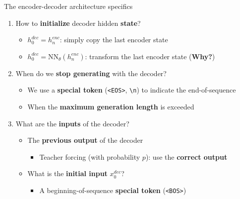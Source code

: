 \documentclass[12pt,aspectratio=169,handout]{beamer}
\begin{document}
\begin{frame}[fragile]{The encoder-decoder architecture specifics}

\begin{enumerate}
\item How to \textbf{initialize} decoder hidden \textbf{state}?
\pause
\begin{itemize}
	\item $h_{0}^{dec} = h_{n}^{enc}$: simply copy the last encoder state
	\item $h_{0}^{dec} = \text{NN}_{\theta}(h_{n}^{enc})$: transform the last encoder state (\textbf{Why?})
\end{itemize}
\pause
\item When do we \textbf{stop generating} with the decoder?
\pause
\begin{itemize}
	\item We use a \textbf{special token} (\verb|<EOS>|, \verb|\n|) to indicate the end-of-sequence
	\item When the \textbf{maximum generation length} is exceeded
\end{itemize}
\pause
\item What are the \textbf{inputs} of the decoder?
\pause
\begin{itemize}
	\item The \textbf{previous output} of the decoder
	\begin{itemize}
		\item Teacher forcing (with probability $p$): use the \textbf{correct output} 
	\end{itemize}
	\pause
	\item What is the \textbf{initial input} $x^{dec}_0$?
	\pause
	\begin{itemize}
		\item A beginning-of-sequence \textbf{special token} (\verb|<BOS>|)
	\end{itemize}
\end{itemize}

\end{enumerate}

\end{frame}
\end{document}
